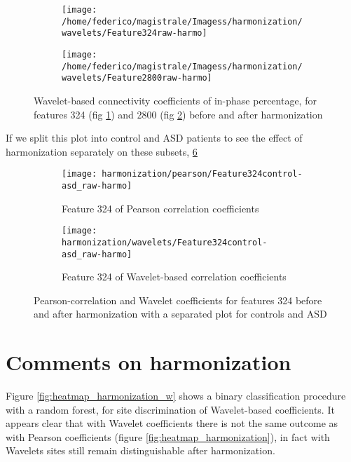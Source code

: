 \documentclass[10pt]{report}
\begin{document}
 \begin{figure}
 \centering
 \begin{subfigure}[b]{1.\textwidth}
    \texttt{[image: /home/federico/magistrale/Imagess/harmonization/wavelets/Feature324raw-harmo]}
    \caption{}
    \label{fig:wavelet_feature324}
 \end{subfigure}
 \begin{subfigure}[b]{1.\textwidth}
    \texttt{[image: /home/federico/magistrale/Imagess/harmonization/wavelets/Feature2800raw-harmo]}
    \caption{}
    \label{fig:wavelet_feature2800}
 \end{subfigure}
 \caption{Wavelet-based connectivity coefficients of in-phase percentage, for features 324 (fig \ref{fig:wavelet_feature324}) and 2800 (fig \ref{fig:wavelet_feature2800}) before and after harmonization}
 \label{fig:wavelet_features_raw-harmo}
 \end{figure}



 If we split this plot into control and ASD patients to see the effect of harmonization separately on these subsets, \ref{fig:features_control-asd_raw-harmo}

 \begin{figure}
 \centering
 \begin{subfigure}[b]{1.\textwidth}
    \texttt{[image: harmonization/pearson/Feature324control-asd\_raw-harmo]}
    \caption{Feature 324 of Pearson correlation coefficients}
    \label{fig:feature324-control-asd}
 \end{subfigure}
 \begin{subfigure}[b]{1.\textwidth}
    \texttt{[image: harmonization/wavelets/Feature324control-asd\_raw-harmo]}
    \caption{Feature 324 of Wavelet-based correlation coefficients}
    \label{fig:feature324-control-asd_w}
 \end{subfigure}
 \caption{Pearson-correlation and Wavelet coefficients for features 324 before and after harmonization with a separated plot for controls and ASD}
 \label{fig:features_control-asd_raw-harmo}
 \end{figure}




\section{Comments on harmonization}

Figure \ref{fig:heatmap_harmonization_w} shows a binary classification procedure with a random forest, for site discrimination of Wavelet-based coefficients. It appears clear that with Wavelet coefficients there is not the same outcome as with Pearson coefficients (figure \ref{fig:heatmap_harmonization}), in fact with Wavelets sites still remain distinguishable after harmonization.
\end{document}
